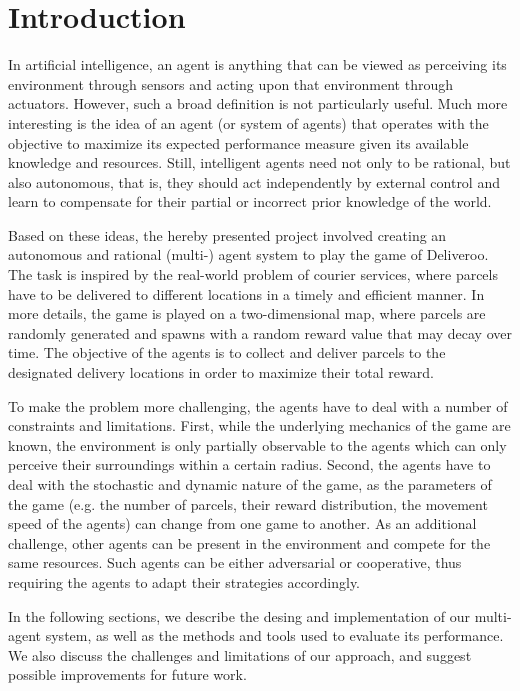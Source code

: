 \section{Introduction}

In artificial intelligence, an agent is anything that can be viewed as perceiving its environment through sensors and acting upon that environment through actuators. However, such a broad definition is not particularly useful. Much more interesting is the idea of an agent (or system of agents) that operates with the objective to maximize its expected performance measure given its available knowledge and resources. Still, intelligent agents need not only to be rational, but also autonomous, that is, they should act independently by external control and learn to compensate for their partial or incorrect prior knowledge of the world.

Based on these ideas, the hereby presented project involved creating an autonomous and rational (multi-) agent system to play the game of Deliveroo. The task is inspired by the real-world problem of courier services, where parcels have to be delivered to different locations in a timely and efficient manner. In more details, the game is played on a two-dimensional map, where parcels are randomly generated and spawns with a random reward value that may decay over time. The objective of the agents is to collect and deliver parcels to the designated delivery locations in order to maximize their total reward.

To make the problem more challenging, the agents have to deal with a number of constraints and limitations. First, while the underlying mechanics of the game are known, the environment is only partially observable to the agents which can only perceive their surroundings within a certain radius. Second, the agents have to deal with the stochastic and dynamic nature of the game, as the parameters of the game (e.g. the number of parcels, their reward distribution, the movement speed of the agents) can change from one game to another. As an additional challenge, other agents can be present in the environment and compete for the same resources. Such agents can be either adversarial or cooperative, thus requiring the agents to adapt their strategies accordingly.

In the following sections, we describe the desing and implementation of our multi-agent system, as well as the methods and tools used to evaluate its performance. We also discuss the challenges and limitations of our approach, and suggest possible improvements for future work.